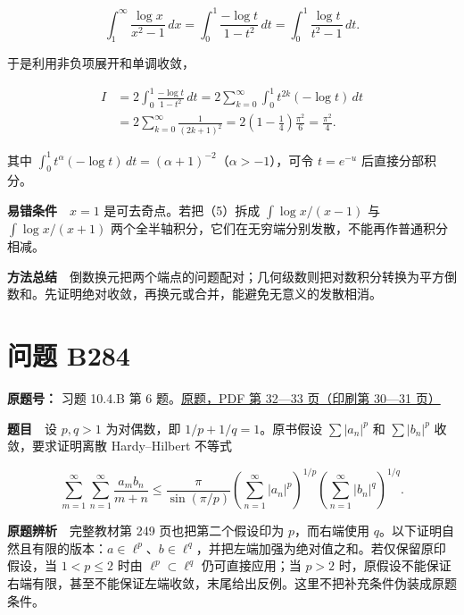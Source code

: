 \documentclass[11pt,a4paper]{article}
\begin{document}
\begin{equation}
\int_1^\infty\frac{\log x}{x^2-1}\,dx
=\int_0^1\frac{-\log t}{1-t^2}\,dt
=\int_0^1\frac{\log t}{t^2-1}\,dt.
\tag{6}
\end{equation}

于是利用非负项展开和单调收敛，

\begin{equation}
\begin{aligned}
I&=2\int_0^1\frac{-\log t}{1-t^2}\,dt
=2\sum_{k=0}^\infty\int_0^1t^{2k}(-\log t)\,dt\\
&=2\sum_{k=0}^\infty\frac1{(2k+1)^2}
=2\left(1-\frac14\right)\frac{\pi^2}{6}
=\frac{\pi^2}{4}.
\end{aligned}
\tag{7}
\end{equation}

其中
\(\int_0^1t^\alpha(-\log t)\,dt=(\alpha+1)^{-2}\)（\(\alpha>-1\)），可令
\(t=e^{-u}\) 后直接分部积分。

\textbf{易错条件}　\(x=1\) 是可去奇点。若把（5）拆成
\(\int\log x/(x-1)\) 与 \(\int\log x/(x+1)\)
两个全半轴积分，它们在无穷端分别发散，不能再作普通积分相减。

\textbf{方法总结}　倒数换元把两个端点的问题配对；几何级数则把对数积分转换为平方倒数和。先证明绝对收敛，再换元或合并，能避免无意义的发散相消。

\section{问题 B284}\label{ux95eeux9898-b284}

\textbf{原题号：} 习题 10.4.B 第 6
题。\href{https://zj139.github.io/math-notes/files/problems/楼分析习题-v2.pdf\#page=32}{原题，PDF
第 32---33 页（印刷第 30---31 页）}

\textbf{题目}　设 \(p,q>1\) 为对偶数，即 \(1/p+1/q=1\)。原书假设
\(\sum|a_n|^p\) 和 \(\sum|b_n|^p\) 收敛，要求证明离散 Hardy--Hilbert
不等式

\begin{equation}
\sum_{m=1}^\infty\sum_{n=1}^\infty\frac{a_m b_n}{m+n}
\le\frac{\pi}{\sin(\pi/p)}
\left(\sum_{n=1}^\infty|a_n|^p\right)^{1/p}
\left(\sum_{n=1}^\infty|b_n|^q\right)^{1/q}.
\tag{8}
\end{equation}

\textbf{原题辨析}　完整教材第 249 页也把第二个假设印为 \(p\)，而右端使用
\(q\)。以下证明自然且有限的版本：\(a\in\ell^p\)、\(b\in\ell^q\)，并把左端加强为绝对值之和。若仅保留原印假设，当
\(1<p\le2\) 时由 \(\ell^p\subset\ell^q\) 仍可直接应用；当 \(p>2\)
时，原假设不能保证右端有限，甚至不能保证左端收敛，末尾给出反例。这里不把补充条件伪装成原题条件。
\end{document}
